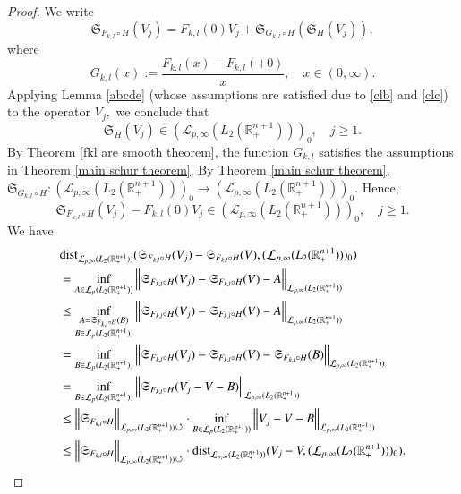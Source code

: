\documentclass[12pt]{amsart}
\begin{document}
\begin{proof} We write
$$\mathfrak{S}_{F_{k,l}\circ H}(V_j)=F_{k,l}(0)V_j+\mathfrak{S}_{G_{k,l}\circ H}(\mathfrak{S}_H(V_j)),$$
where
$$G_{k,l}(x):=\frac{F_{k,l}(x)-F_{k,l}(+0)}{x},\quad x\in(0,\infty).$$
Applying Lemma \ref{abcde} (whose assumptions are satisfied due to \eqref{clb} and \eqref{clc}) to the operator $V_j,$ we conclude that
$$\mathfrak{S}_H(V_j)\in (\mathcal{L}_{p,\infty}(L_2(\mathbb{R}^{n+1}_+)))_0,\quad j\geq 1.$$
By Theorem \ref{fkl are smooth theorem}, the function $G_{k,l}$ satisfies the assumptions in Theorem \ref{main schur theorem}. By Theorem \ref{main schur theorem},  $\mathfrak{S}_{G_{k,l}\circ H}:(\mathcal{L}_{p,\infty}(L_2(\mathbb{R}^{n+1}_+)))_0\to (\mathcal{L}_{p,\infty}(L_2(\mathbb{R}^{n+1}_+)))_0.$  Hence,
\begin{equation}\label{cl eq0}
\mathfrak{S}_{F_{k,l}\circ H}(V_j)-F_{k,l}(0)V_j\in (\mathcal{L}_{p,\infty}(L_2(\mathbb{R}^{n+1}_+)))_0,\quad j\geq 1.
\end{equation}
We have
\begin{align*}
&{\rm dist}_{\mathcal{L}_{p,\infty}(L_2(\mathbb{R}^{n+1}_+))}(\mathfrak{S}_{F_{k,l}\circ H}(V_j)-\mathfrak{S}_{F_{k,l}\circ H}(V),(\mathcal{L}_{p,\infty}(L_2(\mathbb{R}^{n+1}_+)))_0)\\
&=\inf_{A\in \mathcal{L}_p(L_2(\mathbb{R}^{n+1}_+))}\Big\|\mathfrak{S}_{F_{k,l}\circ H}(V_j)-\mathfrak{S}_{F_{k,l}\circ H}(V)-A\Big\|_{\mathcal{L}_{p,\infty}(L_2(\mathbb{R}^{n+1}_+))}\\
&\leq\inf_{\substack{A=\mathfrak{S}_{F_{k,l}\circ H}(B)\\ B\in \mathcal{L}_p(L_2(\mathbb{R}^{n+1}_+))}}\Big\|\mathfrak{S}_{F_{k,l}\circ H}(V_j)-\mathfrak{S}_{F_{k,l}\circ H}(V)-A\Big\|_{\mathcal{L}_{p,\infty}(L_2(\mathbb{R}^{n+1}_+))}\\
&=\inf_{B\in \mathcal{L}_p(L_2(\mathbb{R}^{n+1}_+))}\Big\|\mathfrak{S}_{F_{k,l}\circ H}(V_j)-\mathfrak{S}_{F_{k,l}\circ H}(V)-\mathfrak{S}_{F_{k,l}\circ H}(B)\Big\|_{\mathcal{L}_{p,\infty}(L_2(\mathbb{R}^{n+1}_+))}\\
&=\inf_{B\in \mathcal{L}_p(L_2(\mathbb{R}^{n+1}_+))}\Big\|\mathfrak{S}_{F_{k,l}\circ H}(V_j-V-B)\Big\|_{\mathcal{L}_{p,\infty}(L_2(\mathbb{R}^{n+1}_+))}\\
&\leq\Big\|\mathfrak{S}_{F_{k,l}\circ H}\Big\|_{\mathcal{L}_{p,\infty}(L_2(\mathbb{R}^{n+1}_+))\circlearrowleft}\cdot\inf_{B\in \mathcal{L}_p(L_2(\mathbb{R}^{n+1}_+))}\Big\|V_j-V-B\Big\|_{\mathcal{L}_{p,\infty}(L_2(\mathbb{R}^{n+1}_+))}\\
&\leq\Big\|\mathfrak{S}_{F_{k,l}\circ H}\Big\|_{\mathcal{L}_{p,\infty}(L_2(\mathbb{R}^{n+1}_+))\circlearrowleft}\cdot{\rm dist}_{\mathcal{L}_{p,\infty}(L_2(\mathbb{R}^{n+1}_+))}(V_j-V,(\mathcal{L}_{p,\infty}(L_2(\mathbb{R}^{n+1}_+)))_0).

\end{align*}
\end{proof}
\end{document}
